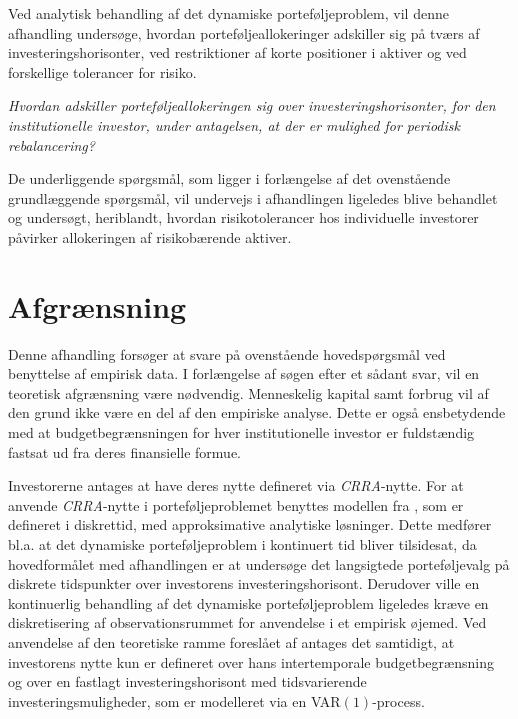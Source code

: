 \documentclass[
  a4paper,
  oneside]{memoir}
\begin{document}
Ved analytisk behandling af det dynamiske porteføljeproblem, vil denne afhandling undersøge, hvordan porteføljeallokeringer adskiller sig på tværs af investeringshorisonter, ved restriktioner af korte positioner i aktiver og ved forskellige tolerancer for risiko.

\begin{center}
\textit{Hvordan adskiller porteføljeallokeringen sig over investeringshorisonter, for den institutionelle investor, under antagelsen, at der er mulighed for periodisk rebalancering?}
\end{center}

De underliggende spørgsmål, som ligger i forlængelse af det ovenstående grundlæggende spørgsmål, vil undervejs i afhandlingen ligeledes blive behandlet og undersøgt, heriblandt, hvordan risikotolerancer hos individuelle investorer påvirker allokeringen af risikobærende aktiver.

\hypertarget{afgruxe6nsning}{%
\section{Afgrænsning}\label{afgruxe6nsning}}

Denne afhandling forsøger at svare på ovenstående hovedspørgsmål ved benyttelse af empirisk data. I forlængelse af søgen efter et sådant svar, vil en teoretisk afgrænsning være nødvendig. Menneskelig kapital samt forbrug vil af den grund ikke være en del af den empiriske analyse. Dette er også ensbetydende med at budgetbegrænsningen for hver institutionelle investor er fuldstændig fastsat ud fra deres finansielle formue.

Investorerne antages at have deres nytte defineret via \emph{CRRA}-nytte. For at anvende \emph{CRRA}-nytte i porteføljeproblemet benyttes modellen fra \citep{JurVic2011}, som er defineret i diskrettid, med approksimative analytiske løsninger. Dette medfører bl.a. at det dynamiske porteføljeproblem i kontinuert tid bliver tilsidesat, da hovedformålet med afhandlingen er at undersøge det langsigtede porteføljevalg på diskrete tidspunkter over investorens investeringshorisont. Derudover ville en kontinuerlig behandling af det dynamiske porteføljeproblem ligeledes kræve en diskretisering af observationsrummet for anvendelse i et empirisk øjemed. Ved anvendelse af den teoretiske ramme foreslået af \citep{JurVic2011} antages det samtidigt, at investorens nytte kun er defineret over hans intertemporale budgetbegrænsning og over en fastlagt investeringshorisont med tidsvarierende investeringsmuligheder, som er modelleret via en VAR\((1)\)-process.
\end{document}
